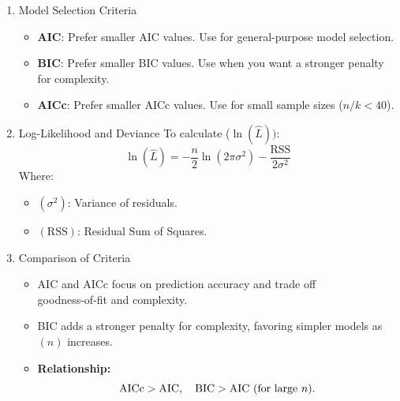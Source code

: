 \documentclass[12pt]{book}
\begin{document}
\begin{enumerate}
    \textbf{Interpretation} -
    \begin{itemize}
        \item [-] The correction term (\( \frac{2k(k+1)}{n - k - 1} \)) increases the penalty when \( n \) is small relative to \( k \).
        \item [-] As \( n \to \infty \), AICc converges to AIC.
    \end{itemize}

    \item Model Selection Criteria
    \begin{itemize}
        \item [-] \textbf{AIC}: Prefer smaller AIC values. Use for general-purpose model selection.
        \item [-] \textbf{BIC}: Prefer smaller BIC values. Use when you want a stronger penalty for complexity.
        \item [-] \textbf{AICc}: Prefer smaller AICc values. Use for small sample sizes (\( n/k < 40 \)).
    \end{itemize}

    \item  Log-Likelihood and Deviance
    To calculate (\( \ln(\hat{L}) )\):
    \[
    \ln(\hat{L}) = -\frac{n}{2} \ln(2\pi\sigma^2) - \frac{\text{RSS}}{2\sigma^2}
    \]
    Where:
    \begin{itemize}
        \item [-] \(( \sigma^2 )\): Variance of residuals.
        \item [-] \(( \text{RSS} )\): Residual Sum of Squares.
    \end{itemize}

    \item Comparison of Criteria
    \begin{itemize}
        \item [-] AIC and AICc focus on prediction accuracy and trade off \\ goodness-of-fit and complexity.
        \item [-] BIC adds a stronger penalty for complexity, favoring simpler models as \(( n )\) increases.
        \item [-] \textbf{Relationship:}
        \[
          \text{AICc} > \text{AIC}, \quad \text{BIC} > \text{AIC} \text{ (for large \( n \))}.
        \]
    \end{itemize}


\end{enumerate}
\end{document}

